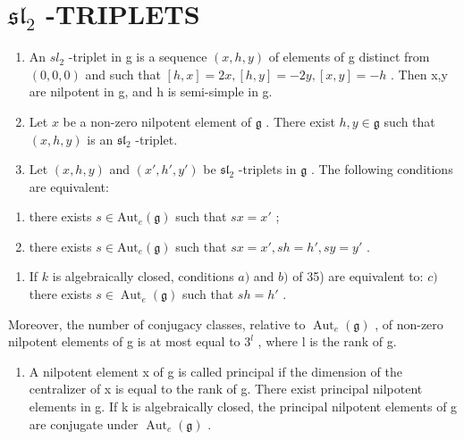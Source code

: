 \section*{\texorpdfstring{\(\mathfrak{sl}_2\) -TRIPLETS}{\textbackslash mathfrak\{sl\}\_2 -TRIPLETS}}

\begin{enumerate}
\def\labelenumi{\arabic{enumi})}
\setcounter{enumi}{32}
\item
  An \(sl_{2}\) -triplet in g is a sequence \((x,h,y)\) of elements of g distinct from \((0,0,0)\) and such that \([h,x]=2x,[h,y]=-2y,[x,y]=-h\) . Then x,y are nilpotent in g, and h is semi-simple in g.
\item
  Let \(x\) be a non-zero nilpotent element of \(\mathfrak{g}\) . There exist \(h, y \in \mathfrak{g}\) such that \((x, h, y)\) is an \(\mathfrak{sl}_2\) -triplet.
\item
  Let \((x,h,y)\) and \((x',h',y')\) be \(\mathfrak{sl}_2\) -triplets in \(\mathfrak{g}\) . The following conditions are equivalent:
\end{enumerate}

\begin{enumerate}
\def\labelenumi{\alph{enumi})}
\item
  there exists \(s \in \text{Aut}_{e}(\mathfrak{g})\) such that \(sx = x'\) ;
\item
  there exists \(s \in \mathrm{Aut}_e(\mathfrak{g})\) such that \(sx = x', sh = h', sy = y'\) .
\end{enumerate}

\begin{enumerate}
\def\labelenumi{\arabic{enumi})}
\setcounter{enumi}{35}
\tightlist
\item
  If \(k\) is algebraically closed, conditions \(a)\) and \(b)\) of 35) are equivalent to: \(c)\) there exists \(s \in \operatorname{Aut}_e(\mathfrak{g})\) such that \(sh = h'\) .
\end{enumerate}

Moreover, the number of conjugacy classes, relative to \(\operatorname{Aut}_{e}(\mathfrak{g})\) , of non-zero nilpotent elements of g is at most equal to \(3^{l}\) , where l is the rank of g.

\begin{enumerate}
\def\labelenumi{\arabic{enumi})}
\setcounter{enumi}{36}
\tightlist
\item
  A nilpotent element x of g is called principal if the dimension of the centralizer of x is equal to the rank of g. There exist principal nilpotent elements in g. If k is algebraically closed, the principal nilpotent elements of g are conjugate under \(\operatorname{Aut}_{e}(\mathfrak{g})\) .
\end{enumerate}

